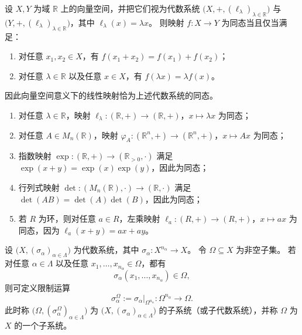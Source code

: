 \documentclass[lang=cn,a4paper,newtx]{elegantbook}
\begin{document}
\begin{example}
设 $X,Y$ 为域 $\mathbb R$ 上的向量空间，并把它们视为代数系统 $\bigl(X,+,(\ell_{\lambda})_{\lambda\in\mathbb R}\bigr)$ 与 $\bigl(Y,+,(\ell_{\lambda})_{\lambda\in\mathbb R}\bigr)$，其中 $\ell_{\lambda}(x)=\lambda x$。
则映射 $f:X\to Y$ 为同态当且仅当满足：
\begin{enumerate}
  \item 对任意 $x_1,x_2\in X$，有 $f(x_1+x_2)=f(x_1)+f(x_2)$；
  \item 对任意 $\lambda\in\mathbb R$ 以及任意 $x\in X$，有 $f(\lambda x)=\lambda f(x)$。
\end{enumerate}
因此向量空间意义下的线性映射恰为上述代数系统的同态。
\end{example}

\begin{example}
\leavevmode
\begin{enumerate}
  \item 对任意 $\lambda\in\mathbb R$，映射 $\ell_{\lambda}:(\mathbb R,+)\to(\mathbb R,+)$，$x\mapsto \lambda x$ 为同态；
  \item 对任意 $A\in M_n(\mathbb R)$，映射 $\varphi_A:(\mathbb R^n,+)\to(\mathbb R^n,+)$，$x\mapsto Ax$ 为同态；
  \item 指数映射 $\exp:(\mathbb R,+)\to(\mathbb R_{>0},\cdot)$ 满足 $\exp(x+y)=\exp(x)\exp(y)$，因此为同态；
  \item 行列式映射 $\det:(M_n(\mathbb R),\cdot)\to(\mathbb R,\cdot)$ 满足 $\det(AB)=\det(A)\det(B)$，因此为同态；
  \item 若 $R$ 为环，则对任意 $a\in R$，左乘映射 $\ell_a:(R,+)\to(R,+)$，$x\mapsto ax$ 为同态，因为 $\ell_a(x+y)=ax+ay$。
\end{enumerate}
\end{example}

\begin{definition}[子系统]
设 $\bigl(X,(\sigma_{\alpha})_{\alpha\in\Lambda}\bigr)$ 为代数系统，其中 $\sigma_{\alpha}:X^{n_{\alpha}}\to X$。
令 $\Omega\subseteq X$ 为非空子集。
若对任意 $\alpha\in\Lambda$ 以及任意 $x_1,\dots,x_{n_{\alpha}}\in\Omega$，都有
\[
  \sigma_{\alpha}(x_1,\dots,x_{n_{\alpha}})\in\Omega,
\]
则可定义限制运算
\[
  \sigma_{\alpha}^{\Omega}:=\sigma_{\alpha}\big|_{\Omega^{n_{\alpha}}}:\Omega^{n_{\alpha}}\to\Omega.
\]
此时称 $\bigl(\Omega,(\sigma_{\alpha}^{\Omega})_{\alpha\in\Lambda}\bigr)$ 为 $\bigl(X,(\sigma_{\alpha})_{\alpha\in\Lambda}\bigr)$ 的子系统（或子代数系统），并称 $\Omega$ 为 $X$ 的一个子系统。
\end{definition}
\end{document}
